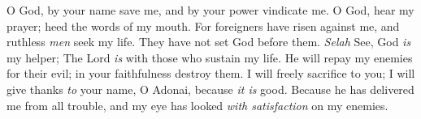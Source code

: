 \begin{biblechapter} %
 O God, by your name save me, 
and by your power vindicate me.
\verse O God, hear my prayer; 
heed the words of my mouth.
\verse For foreigners have risen against me, 
and ruthless \textit{men} seek my life. 
They have not set God before them. \textit{Selah}
\verse See, God \textit{is} my helper; 
The Lord \textit{is} with those who sustain my life.
\verse He will repay my enemies for their evil; 
in your faithfulness destroy them.
\verse I will freely sacrifice to you; 
I will give thanks \textit{to} your name, 
O Adonai, because \textit{it is} good.
\verse Because he has delivered me from all trouble, 
and my eye has looked \textit{with satisfaction} on my enemies.
\end{biblechapter}

